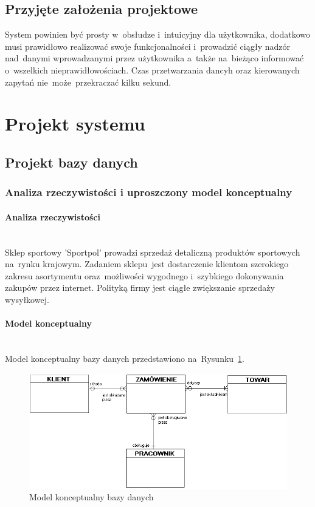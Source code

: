 \documentclass[a4paper, 12pt]{article}
\begin{document}
\subsection{Przyjęte założenia projektowe}
System powinien być prosty w~obsłudze i~intuicyjny dla użytkownika, dodatkowo musi prawidłowo realizować swoje funkcjonalności i~prowadzić ciągły nadzór nad~danymi wprowadzanymi przez użytkownika a~także na~bieżąco informować o~wszelkich nieprawidłowościach. Czas przetwarzania dancyh oraz kierowanych zapytań nie~może~przekraczać kilku sekund.
\section{Projekt systemu}
\subsection{Projekt bazy danych}
\subsubsection{Analiza rzeczywistości i uproszczony model konceptualny}
\paragraph{Analiza rzeczywistości} \mbox{}\\
Sklep sportowy 'Sportpol' prowadzi sprzedaż detaliczną produktów sportowych na~rynku krajowym. Zadaniem sklepu~jest dostarczenie klientom szerokiego zakresu asortymentu oraz~możliwości wygodnego i~szybkiego dokonywania zakupów przez internet. Polityką firmy jest ciągłe zwiększanie sprzedaży wysyłkowej.

\paragraph{Model konceptualny} \mbox{}\\
Model konceptualny bazy danych przedstawiono na~Rysunku~\ref{fig:modelKonceptualny}.
\begin{figure}[H]
	\includegraphics[width=14cm]{modelKonceptualny.png}
	\caption[Model konceptualny bazy danych]{Model konceptualny bazy danych}
	\label{fig:modelKonceptualny}
\end{figure}
\end{document}
